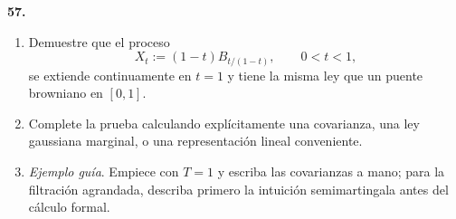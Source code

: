 \documentclass[11pt, letterpaper]{article}
\begin{document}
\newpage

\begin{ejercicio}
    \textbf{57.} 
    \begin{enumerate}
        \item Demuestre que el proceso
        \[ X_{t}:=(1-t)B_{t/(1-t)}, \qquad 0<t<1, \]
        se extiende continuamente en $t=1$ y tiene la misma ley que un puente browniano en $[0,1]$.
        \item Complete la prueba calculando explícitamente una covarianza, una ley gaussiana marginal, o una representación lineal conveniente.
        \item \textit{Ejemplo guía}. Empiece con $T=1$ y escriba las covarianzas a mano; para la filtración agrandada, describa primero la intuición semimartingala antes del cálculo formal.
    \end{enumerate}
\end{ejercicio}

\vspace{5mm}
\end{document}

